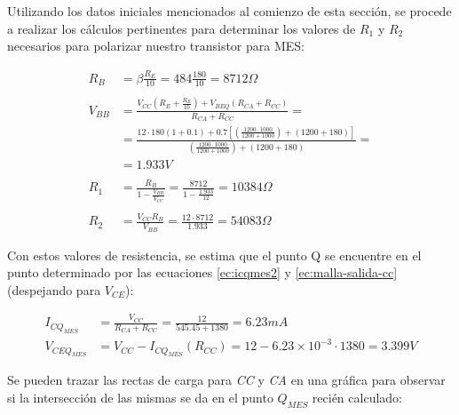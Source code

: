 Utilizando los datos iniciales mencionados al comienzo de esta sección, se procede
a realizar los cálculos pertinentes para determinar los valores de $R_1$ y $R_2$ necesarios
para polarizar nuestro transistor para MES:

\begin{align*}
    R_B &= \beta \frac{R_E}{10} = 484\frac{180}{10} = \boxed{8712\Omega}\\ \\
    V_{BB} &= \frac{V_{CC}(R_E +\frac{R_E}{10}) + V_{BEQ}(R_{CA}+R_{CC})}{R_{CA}+R_{CC}} = \\
    &= \frac{12 \cdot 180(1+0.1) + 0.7[(\frac{1200\cdot1000}{1200+1000})+(1200+180)]}{(\frac{1200\cdot1000}{1200+1000})+(1200+180)} = \\
    &= \boxed{1.933V}\\ \\
    R_1 &= \frac{R_B}{1-\frac{V_{BB}}{V_{CC}}} = \frac{8712}{1-\frac{1.933}{12}} = \boxed{10384\Omega}\\ \\
    R_2 &= \frac{V_{CC}R_B}{V_{BB}} = \frac{12\cdot8712}{1.933} = \boxed{54083\Omega}
\end{align*}

Con estos valores de resistencia, se estima que el punto Q se encuentre en el punto
determinado por las ecuaciones \ref{ec:icqmes2} y \ref{ec:malla-salida-cc} (despejando
para $V_{CE}$):

\begin{align*}
    I_{CQ_{MES}} &= \frac{V_{CC}}{R_{CA} + R_{CC}} = \frac{12}{545.45+1380} = \boxed{6.23mA}\\
    V_{CEQ_{MES}} &= V_{CC} - I_{CQ_{MES}}(R_{CC}) = 12-6.23\times10^{-3} \cdot 1380 = \boxed{3.399V}
\end{align*}

Se pueden trazar las rectas de carga para \emph{CC} y \emph{CA} en una gráfica para
observar si la intersección de las mismas se da en el punto $Q_{MES}$ recién calculado:

